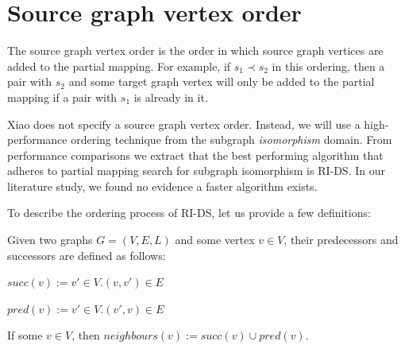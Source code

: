 \section{Source graph vertex order}
\label{sec:sourceOrder}
The source graph vertex order is the order in which source graph vertices are added to the partial mapping. For example, if $s_1 \prec s_2$ in this ordering, then a pair with $s_2$ and some target graph vertex will only be added to the partial mapping if a pair with $s_1$ is already in it.

Xiao does not specify a source graph vertex order. Instead, we will use a high-performance ordering technique from the subgraph \textit{isomorphism} domain. From performance comparisons we extract that the best performing algorithm that adheres to partial mapping search for subgraph isomorphism is RI-DS. In our literature study, we found no evidence a faster algorithm exists. 

To describe the ordering process of RI-DS, let us provide a few definitions:

\begin{defn}
Given two graphs $G=(V, E, L)$ and some vertex $v \in V$, their predecessors and successors are defined as follows:

$succ(v) := {v' \in V . (v, v') \in E}$

$pred(v) := {v' \in V . (v', v) \in E}$
 
\end{defn}

\begin{defn}
If some $v\in V$, then $neighbours(v):= succ(v) \cup pred(v)$.
\end{defn}



